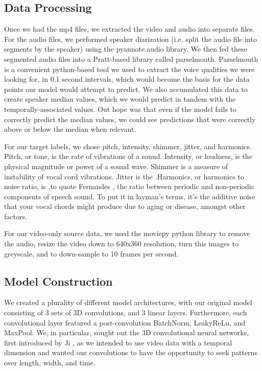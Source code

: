 \documentclass[10pt,twocolumn,letterpaper]{article}
\begin{document}
\subsection{Data Processing}

Once we had the mp4 files, we extracted the video and audio into separate files. For the audio files, we performed speaker diarization (i.e. split the audio file into segments by the speaker) using the pyannote.audio library\cite{Bredin23}. We then fed these segmented audio files into a Pratt\cite{Pratt}-based library called parselmouth\cite{Parselmouth}.  Parselmouth is a convenient python-based tool we used to extract the voice qualities we were looking for, in 0.1 second intervals, which would become the basis for the data points our model would attempt to predict. We also accumulated this data to create speaker median values, which we would predict in tandem with the temporally-associated values. Out hope was that even if the model fails to correctly predict the median values, we could see predictions that were correctly above or below the median when relevant. 

For our target labels, we chose pitch, intensity, shimmer, jitter, and harmonics. Pitch, or tone, is the rate of vibrations of a sound. Intensity, or loudness, is the physical magnitude or power of a sound wave. Shimmer is a measure of instability of vocal cord vibrations. Jitter is the .Harmonics, or harmonics to noise ratio, is ,to quote Fernandes \cite{Harmon2018}, the ratio between periodic and non-periodic components of speech sound. To put it in layman's terms, it's the additive noise that your vocal chords might produce due to aging or disease, amongst other factors.

For our video-only source data, we used the moviepy python library to remove the audio, resize the video down to 640x360 resolution, turn this images to greyscale, and to down-sample to 10 frames per second. 

\subsection{Model Construction}

We created a plurality of different model architectures, with our original model consisting of 3 sets of 3D convolutions, and 3 linear layers. Furthermore, each convolutional layer featured a post-convolution BatchNorm, LeakyReLu, and MaxPool. We, in particular, sought out the 3D convolutional neural networks, first introduced by Ji  \cite{Ji3DConv}, as we intended to use video data with a temporal dimension and wanted our convolutions to have the opportunity to seek patterns over length, width, and time.  
\end{document}
